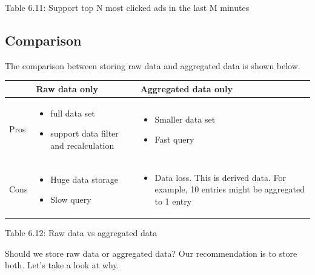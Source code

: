 \documentclass{report}
\theoremstyle{definition}
\let\oldsubsection\subsection
\renewcommand{\subsection}{\oldsubsection*}
\begin{document}
Table 6.11: Support top N most clicked ads in the last M minutes

\subsection{Comparison}

The comparison between storing raw data and aggregated data is shown below.

\begin{tabular}{|p{4cm}|p{4cm}|p{4cm}|}
\hline
 & Raw data only & Aggregated data only \\
\hline
 Pros &
\begin{itemize}
\item full data set
\item support data filter and recalculation
\end{itemize} &
\begin{itemize}
\item
Smaller data set
\item
Fast query
\end{itemize} \\
\hline
Cons
&
\begin{itemize}
\item
Huge data storage
\item
Slow query
\end{itemize}
&
\begin{itemize}
\item
Data loss. This is derived data.
For example, 10 entries might be aggregated to 1 entry
\end{itemize}
\\
\hline
\end{tabular}

Table 6.12: Raw data vs aggregated data

Should we store raw data or aggregated data? Our recommendation is to store both. Let's take a look at why.
\end{document}
